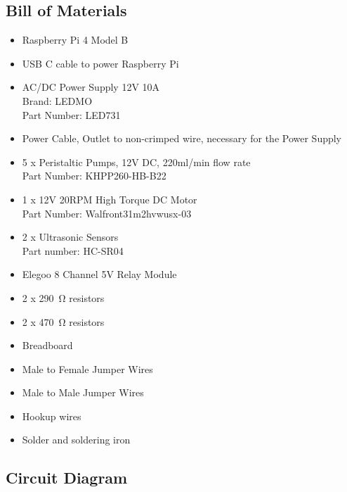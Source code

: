 \documentclass[12pt, titlepage]{article}
\begin{document}
\subsection{Bill of Materials}
\begin{itemize}
        \item Raspberry Pi 4 Model B
        \item USB C cable to power Raspberry Pi
        \item AC/DC Power Supply 12V 10A\\Brand: LEDMO\\Part Number: LED731
        \item Power Cable, Outlet to non-crimped wire, necessary for the Power Supply
        \item 5 x Peristaltic Pumps, 12V DC, 220ml/min flow rate\\Part Number: KHPP260-HB-B22
        \item 1 x 12V 20RPM High Torque DC Motor\\Part Number: Walfront31m2hvwusx-03
        \item 2 x Ultrasonic Sensors \\Part number: HC-SR04
        \item Elegoo 8 Channel 5V Relay Module
        \item 2 x \qty{290}{\ohm} resistors
        \item 2 x \qty{470}{\ohm} resistors
        \item Breadboard
        \item Male to Female Jumper Wires
        \item Male to Male Jumper Wires
        \item Hookup wires
        \item Solder and soldering iron
    \end{itemize}    

\subsection{Circuit Diagram}\\ 
\end{document}

